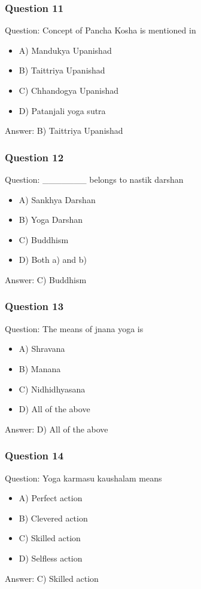\begin{frame}[fragile]\frametitle{Question 11}
Question: Concept of Pancha Kosha is mentioned in
\begin{itemize}
\item A) Mandukya Upanishad
\item B) Taittriya Upanishad
\item C) Chhandogya Upanishad
\item D) Patanjali yoga sutra
\end{itemize}
Answer: B) Taittriya Upanishad
\end{frame}

\begin{frame}[fragile]\frametitle{Question 12}
Question: _______ belongs to nastik darshan
\begin{itemize}
\item A) Sankhya Darshan
\item B) Yoga Darshan
\item C) Buddhism
\item D) Both a) and b)
\end{itemize}
Answer: C) Buddhism
\end{frame}

\begin{frame}[fragile]\frametitle{Question 13}
Question: The means of jnana yoga is
\begin{itemize}
\item A) Shravana
\item B) Manana
\item C) Nidhidhyasana
\item D) All of the above
\end{itemize}
Answer: D) All of the above
\end{frame}

\begin{frame}[fragile]\frametitle{Question 14}
Question: Yoga karmasu kaushalam means
\begin{itemize}
\item A) Perfect action
\item B) Clevered action
\item C) Skilled action
\item D) Selfless action
\end{itemize}
Answer: C) Skilled action
\end{frame}

